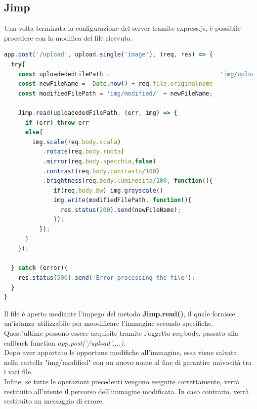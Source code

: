 \subsection{Jimp}
Una volta terminata la configurazione del server tramite express.js, è possibile procedere con la modifica del file ricevuto. 
\begin{lstlisting}[language=Javascript,caption={Elaborazione immagine grazie ai metodi della libreria Jimp}, showstringspaces=false]
app.post('/upload', upload.single('image'), (req, res) => {
  try{
    const uploadededFilePath =                               'img/uploaded/' + req.file.originalname
    const newFileName =  Date.now() + req.file.originalname 
    const modifiedFilePath = 'img/modified/' + newFileName;

    Jimp.read(uploadededFilePath, (err, img) => {
      if (err) throw err
      else{
        img.scale(req.body.scala)
           .rotate(req.body.ruota)
           .mirror(req.body.specchia,false)
           .contrast(req.body.contrasto/100)
           .brightness(req.body.luminosita/100, function(){
              if(req.body.bw) img.grayscale()
              img.write(modifiedFilePath, function(){
                res.status(200).send(newFileName);
              });
          });
      }
    });

  } catch (error){
    res.status(500).send('Error processing the file');
  }
}
\end{lstlisting}
Il file è aperto mediante l'impego del metodo \textbf{Jimp.read()}, il quale fornisce un'istanza utilizzabile per moodificare l'immagine secondo specifiche.
Quest'ultime possono essere acquisite  tramite l'oggetto req.body, passato alla callback function \emph{app.post('/upload',...)}.
\\Dopo aver apportato le opportune modifiche all'immagine, essa viene salvata nella cartella "img/modified" con un nuovo nome al fine di garantire univocità tra i vari file.
\\Infine, se tutte le operazioni precedenti vengono eseguite correttamente, verrà restituito all'utente il percorso dell'immagine modificata. In caso contrario, verrà restituito un messaggio di errore.
\newpage
